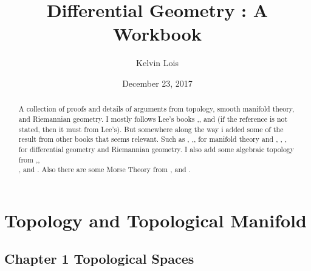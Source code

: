 \documentclass[a4paper]{article}
\title{Differential Geometry : A Workbook}
\author{Kelvin Lois}
\date{December 23, 2017}
\theoremstyle{remark}
\begin{document}
\maketitle  \tableofcontents 

\begin{abstract}
A collection of proofs and details of arguments from topology, smooth manifold theory, and Riemannian geometry. I mostly follows Lee's books \cite{LeeTM},\cite{LeeSM}, and \cite{LeeRM} (if the reference is not stated, then it must from Lee's). But somewhere along the way i added some of the result from other books that seems relevant. Such as \cite{LeeJeff},  \cite{LWTu01},\cite{MilnorDT},\cite{Kosinski} for manifold theory and \cite{WPoor}, \cite{LWTu02}, \cite{LeeJeff}, \cite{doCarmo} for differential geometry and Riemannian geometry. I also add some algebraic topology from \cite{LeeTM},\cite{Rotman},\\ \cite{bredon}, and \cite{Hatcher}. Also there are some Morse Theory from \cite{MilnorM}, \cite{Audin} and \cite{YukioM}.
\end{abstract}


\section{Topology and Topological Manifold}

\subsection*{Chapter 1 Topological Spaces}
\end{document}
